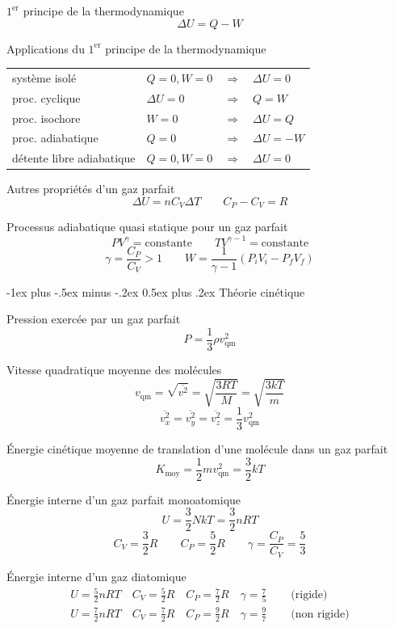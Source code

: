 \documentclass[10pt,landscape]{article}
\makeatletter
\renewcommand{\section}{\@startsection{section}{1}{0mm}%
                                {-1ex plus -.5ex minus -.2ex}%
                                {0.5ex plus .2ex}%
                                {\normalfont\large\bfseries}}
\newcommand{\halfline}{\vspace{0.5em}}
\newcommand{\tableindent}{\hspace{1.5em}}
\makeatother
\begin{document}
\begin{multicols}{3}
$1^\text{er}$ principe de la thermodynamique
\[ \Delta U = Q - W \]

Applications du $1^\text{er}$ principe de la thermodynamique \\
\renewcommand{\arraystretch}{1.2}
\begin{tabular}{@{\tableindent}m{24mm}<{\raggedright}p{18mm}<{\raggedright}cl}
	système isolé & $Q=0, W=0$ &$\Longrightarrow$ & $\Delta U = 0$ \\
	proc. cyclique & $\Delta U = 0$ &$\Longrightarrow$ & $Q=W$ \\
	proc. isochore & $W=0$ &$\Longrightarrow$ & $\Delta U = Q$ \\
	proc. adiabatique & $Q=0$ &$\Longrightarrow$ & $\Delta U = -W$ \\
	détente libre adiabatique & 
		$Q=0, W=0$ %
		&$\Longrightarrow$ & $\Delta U = 0$ \\
\end{tabular}
\renewcommand{\arraystretch}{1}
\halfline

Autres propriétés d'un gaz parfait
\[ \Delta U = n C_V \Delta T  
\qquad 
C_P - C_V = R
\]

Processus adiabatique quasi statique pour un gaz parfait
\[ PV^\gamma = \text{constante} \qquad TV^{\gamma-1} = \text{constante}  \]
\[ \gamma = \frac{C_P}{C_V} > 1 
\qquad 
W = \frac{1}{\gamma - 1} (P_i V_i - P_f V_f) 
\]

\hrulefill

\section{Théorie cinétique}

Pression exercée par un gaz parfait
\[ P = \frac{1}{3} \rho v^2_\text{qm} \]

Vitesse quadratique moyenne des molécules
\[ v_\text{qm} = \sqrt{\overline{v^2}}
= \sqrt{\frac{3RT}{M}} 
= \sqrt{\frac{3kT}{m}} \]
\[ \overline{v^2_x} =  \overline{v^2_y} = \overline{v^2_z} = \frac{1}{3} v^2_\text{qm}  \]

Énergie cinétique moyenne de translation d'une molécule dans un gaz parfait
\[ K_\text{moy} = \frac{1}{2} mv^2_\text{qm} = \frac{3}{2} kT \]

Énergie interne d'un gaz parfait monoatomique
\[ U = \frac{3}{2} NkT = \frac{3}{2} nRT \]
\[ C_V = \frac{3}{2} R 
\qquad
C_P = \frac{5}{2} R
\qquad 
\gamma = \frac{C_P}{C_V} = \frac{5}{3} \]

Énergie interne d'un gaz diatomique
\begin{align*}
	U = \frac{5}{2} nRT \quad 
	C_V = \frac{5}{2} R  \quad 
	C_P = \frac{7}{2} R  \quad
	\gamma = \frac{7}{5} \quad &\text{ (rigide)} \\
	U = \frac{7}{2} nRT \quad 
	C_V = \frac{7}{2} R \quad 
	C_P = \frac{9}{2} R  \quad
	\gamma = \frac{9}{7} \quad &\text{ (non rigide)}
\end{align*}


\end{multicols}
\end{document}
